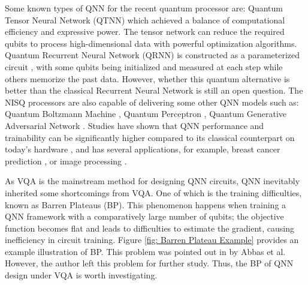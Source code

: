 Some known types of QNN for the recent quantum processor are: 
Quantum Tensor Neural Network (QTNN) \cite{hugginsQuantumMachineLearning2019} which achieved a balance of computational efficiency and expressive power. 
The tensor network can reduce the required qubits to process high-dimensional data with powerful optimization algorithms.
Quantum Recurrent Neural Network (QRNN) is constructed as a parameterized circuit \cite{takakiLearningTemporalData2021}, with some qubits being initialized and measured at each step while others memorize the past data.
However, whether this quantum alternative is better than the classical Recurrent Neural Network is still an open question.
The NISQ processors are also capable of delivering some other QNN models such as: 
Quantum Boltzmann Machine \cite{shinguBoltzmannMachineLearning2021}\cite{zoufalVariationalQuantumBoltzmann2021}, 
Quantum Perceptron \cite{kristensenArtificialSpikingQuantum2021}, 
Quantum Generative Adversarial Network \cite{dallaire-demersQuantumGenerativeAdversarial2018}\cite{lloydQuantumGenerativeAdversarial2018}. Studies have shown that QNN performance and trainability can be significantly higher compared to its classical counterpart on today's hardware \cite{abbasPowerQuantumNeural2021, colesSeekingQuantumAdvantage2021}, and has several applications, for example, breast cancer prediction \cite{liModelAlgorithmQuantuminspired2014}, or image processing \cite{matsuiQubitNeuralNetwork2009}.

As VQA is the mainstream method for designing QNN circuits, QNN inevitably inherited some shortcomings from VQA.
One of which is the training difficulties, known as Barren Plateaus (BP).
This phenomenon happens when training a QNN framework with a comparatively large number of qubits; the objective function becomes flat and leads to difficulties to estimate the gradient, \cite{mccleanBarrenPlateausQuantum2018, zhaoAnalyzingBarrenPlateau2021} causing inefficiency in circuit training. 
Figure \ref{fig: Barren Plateau Example} provides an example illustration of BP.
This problem was pointed out in \cite{abbasPowerQuantumNeural2021} by Abbas et al. However, the author left this problem for further study. 
Thus, the BP of QNN design under VQA is worth investigating.

